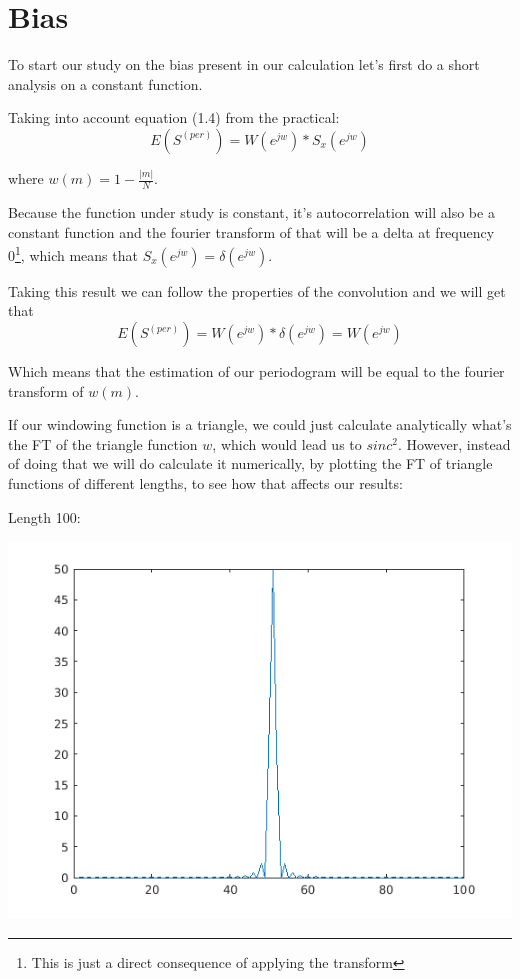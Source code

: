 \documentclass[conference,9pt]{IEEEtran}
\begin{document}
\section{Bias}
To start our study on the bias present in our calculation let's first do a short analysis on a constant function.

Taking into account equation (1.4) from the practical:
$$E(S^{(per)})=W(e^{jw})*S_x(e^{jw})$$

where $w(m)=1-\frac{|m|}{N}$.

Because the function under study is constant, it's autocorrelation will also be a constant function and the fourier transform of that will be a delta at frequency 0\footnote{This is just a direct consequence of applying the transform}, which means that $S_x(e^{jw})=\delta(e^{jw})$.

Taking this result we can follow the properties of the convolution and we will get that 
$$E(S^{(per)})=W(e^{jw})*\delta(e^{jw})=W(e^{jw})$$

Which means that the estimation of our periodogram will be equal to the fourier transform of $w(m)$.

If our windowing function is a triangle, we could just calculate analytically what's the FT of the triangle function $w$, which would lead us to $sinc^2$. However, instead of doing that we will do calculate it numerically, by plotting the FT of triangle functions of different lengths, to see how that affects our results:

Length 100:

\includegraphics[scale=0.6]{triang100.png}
\end{document}
